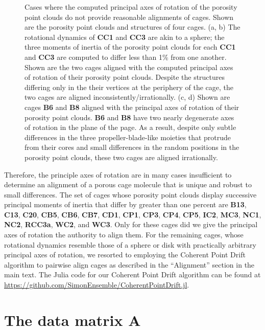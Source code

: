 \documentclass[journal=jacsat,manuscript=article]{achemso}
\begin{document}
{\begin{figure}
	\caption{{\color{red} Cases where the computed principal axes of rotation of the porosity point clouds do not provide reasonable alignments of cages. Shown are the porosity point clouds and structures of four cages. (a, b) The rotational dynamics of \textbf{CC1} and \textbf{CC3} are akin to a sphere; the three moments of inertia of the porosity point clouds for each \textbf{CC1} and \textbf{CC3} are computed to differ less than 1\% from one another. Shown are the two cages aligned with the computed principal axes of rotation of their porosity point clouds. Despite the structures differing only in the their vertices at the periphery of the cage, the two cages are aligned inconsistently/irrationally. (c, d) Shown are cages \textbf{B6} and \textbf{B8} aligned with the principal axes of rotation of their porosity point clouds. \textbf{B6} and \textbf{B8} have two nearly degenerate axes of rotation in the plane of the page. As a result, despite only subtle differences in the three propeller-blade-like moieties that protrude from their cores and small differences in the random positions in the porosity point clouds, these two cages are aligned irrationally.
	}%
	} \label{fig:misaligned}
\end{figure}

Therefore, the principle axes of rotation are in many cases insufficient to determine an alignment of a porous cage molecule that is unique and robust to small differences. The set of cages whose porosity point clouds display successive principal moments of inertia that differ by greater than one percent are \textbf{B13}, \textbf{C13}, \textbf{C20}, \textbf{CB5}, \textbf{CB6}, \textbf{CB7}, \textbf{CD1}, \textbf{CP1}, \textbf{CP3}, \textbf{CP4}, \textbf{CP5}, \textbf{IC2}, \textbf{MC3}, \textbf{NC1}, \textbf{NC2}, \textbf{RCC3a}, \textbf{WC2}, and \textbf{WC3}. Only for these cages did we give the principal axes of rotation the authority to align them. For the remaining cages, whose rotational dynamics resemble those of a sphere or disk with practically arbitrary principal axes of rotation, we resorted to employing the Coherent Point Drift algorithm to pairwise align cages as described in the ``Alignment'' section in the main text. The Julia code for our Coherent Point Drift algorithm can be found at \url{https://github.com/SimonEnsemble/CoherentPointDrift.jl}.

} %

\newpage

\section{The data matrix $\mathbf{A}$}
\end{document}
